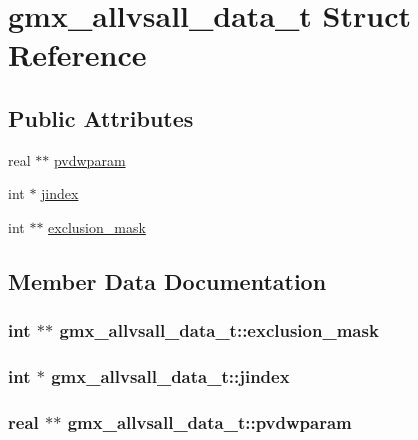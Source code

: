 \hypertarget{structgmx__allvsall__data__t}{\section{gmx\-\_\-allvsall\-\_\-data\-\_\-t \-Struct \-Reference}
\label{structgmx__allvsall__data__t}
}
\subsection*{\-Public \-Attributes}
\begin{DoxyCompactItemize}
\item 
real $\ast$$\ast$ \hyperlink{structgmx__allvsall__data__t_a42c79085dd02aa165b2089381ff5dd84}{pvdwparam}
\item 
int $\ast$ \hyperlink{structgmx__allvsall__data__t_a32266c39c105ba0a266196a19b4e6464}{jindex}
\item 
int $\ast$$\ast$ \hyperlink{structgmx__allvsall__data__t_acea65aaaeabd002a7225af66be131d92}{exclusion\-\_\-mask}
\end{DoxyCompactItemize}


\subsection{\-Member \-Data \-Documentation}
\hypertarget{structgmx__allvsall__data__t_acea65aaaeabd002a7225af66be131d92}{
\subsubsection[{exclusion\-\_\-mask}]{\setlength{\rightskip}{0pt plus 5cm}int $\ast$$\ast$ {\bf gmx\-\_\-allvsall\-\_\-data\-\_\-t\-::exclusion\-\_\-mask}}}\label{structgmx__allvsall__data__t_acea65aaaeabd002a7225af66be131d92}
\hypertarget{structgmx__allvsall__data__t_a32266c39c105ba0a266196a19b4e6464}{
\subsubsection[{jindex}]{\setlength{\rightskip}{0pt plus 5cm}int $\ast$ {\bf gmx\-\_\-allvsall\-\_\-data\-\_\-t\-::jindex}}}\label{structgmx__allvsall__data__t_a32266c39c105ba0a266196a19b4e6464}
\hypertarget{structgmx__allvsall__data__t_a42c79085dd02aa165b2089381ff5dd84}{
\subsubsection[{pvdwparam}]{\setlength{\rightskip}{0pt plus 5cm}real $\ast$$\ast$ {\bf gmx\-\_\-allvsall\-\_\-data\-\_\-t\-::pvdwparam}}}\label{structgmx__allvsall__data__t_a42c79085dd02aa165b2089381ff5dd84}


